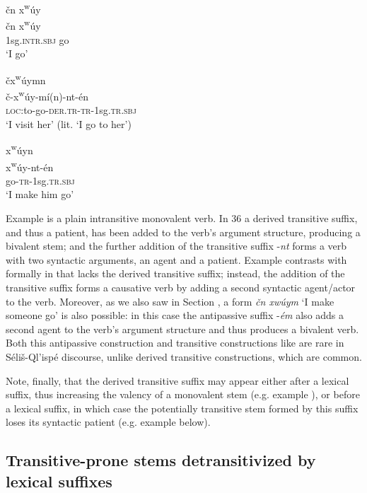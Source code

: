 \documentclass[output=paper,colorlinks,citecolor=brown]{langscibook}
\begin{document}
\ea 
\label{ex-thomason-35}
\v{c}n x\textsuperscript w\'uy \\
\gll \v{c}n x\textsuperscript w\'uy \\
1sg.\textsc{intr.sbj} go \\
\glt `I go'
\z

\ea 
\label{ex-thomason-36}
\v{c}x\textsuperscript w\'uymn \\
\gll \v{c}-x\textsuperscript w\'uy-m\'i(n)-nt-\'en \\
\textsc{loc:}to-go-\textsc{der.tr-tr}-1sg.\textsc{tr.sbj} \\
\glt `I visit her' (lit. `I go to her')
\z

\ea 
\label{ex-thomason-37}
x\textsuperscript w\'uyn \\
\gll x\textsuperscript w\'uy-nt-\'en \\
go-\textsc{tr}-1sg.\textsc{tr.sbj} \\
\glt `I make him go'
\z

Example  is a plain intransitive monovalent verb. In 36 a derived
transitive suffix, and thus a patient, has been added to the verb's
argument structure, producing a bivalent stem; and the further
addition of the transitive suffix -\emph{nt} forms a verb with two
syntactic arguments, an agent and a patient.  Example  contrasts with 
formally in that  lacks the derived transitive suffix; instead, the
addition of the transitive suffix forms a causative verb by adding a
second syntactic agent/actor to the verb.  Moreover, as we also saw in
Section , a form \emph{\v{c}n xw\'uym} `I make someone go' is also
possible: in this case the antipassive suffix -\emph{\'em} also adds a
second agent to the verb's argument structure and thus produces a
bivalent verb.  Both this antipassive construction and transitive
constructions like  are rare in S\'eli\v{s}-Ql'isp\'e discourse,
unlike derived transitive constructions, which are common.

Note, finally, that the derived transitive suffix may appear either
after a lexical suffix, thus increasing the valency of a monovalent
stem (e.g. example ), or before a lexical suffix, in which case the
potentially transitive stem formed by this suffix loses its syntactic
patient (e.g. example  below).

\subsection{Transitive-prone stems detransitivized by lexical suffixes}  %
\label{thomason_section_2.8}
\end{document}
